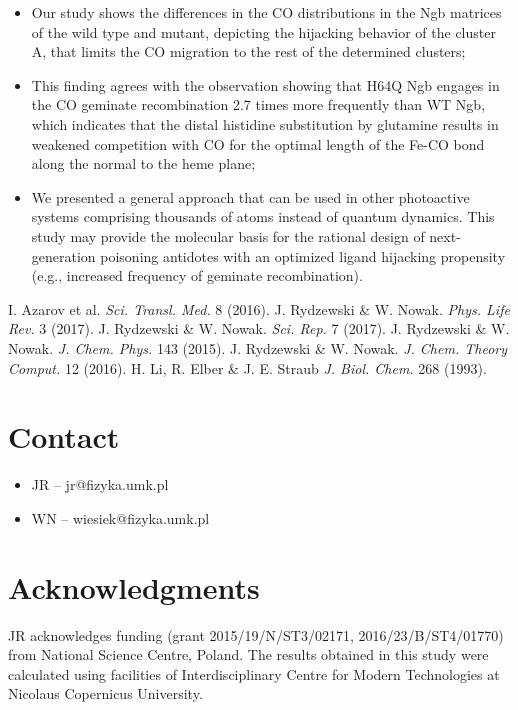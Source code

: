 \documentclass[a0,portrait]{a0poster}
\newcommand{\bi}{\item[\color{myblue}\ding{108}]}
\begin{document}
\begin{multicols}{2}
\begin{itemize}
\setlength\itemsep{1cm}
	\bi Our study shows the differences in the CO distributions in the Ngb matrices of the wild type and mutant, depicting the hijacking behavior of the cluster A, that limits the CO migration to the rest of the determined clusters;
	\bi This finding agrees with the observation showing that H64Q Ngb engages in the CO geminate recombination 2.7 times more frequently than WT Ngb, which indicates that the distal histidine substitution by glutamine results in weakened competition with CO for the optimal length of the Fe-CO bond along the normal to the heme plane;
	\bi We presented a general approach that can be used in other photoactive systems comprising thousands of atoms instead of quantum dynamics. This study may provide the molecular basis for the rational design of next-generation poisoning antidotes with an optimized ligand hijacking propensity (e.g., increased frequency of geminate recombination).
\end{itemize}

\color{myblue}
\begin{thebibliography}{6}%
\color{black}
 I. Azarov et al. \textit{Sci. Transl. Med.} 8 (2016).
 J. Rydzewski \& W. Nowak. \textit{Phys. Life Rev.} 3 (2017).
 J. Rydzewski \& W. Nowak. \textit{Sci. Rep.} 7 (2017).
 J. Rydzewski \& W. Nowak. \textit{J. Chem. Phys.} 143 (2015).
 J. Rydzewski \& W. Nowak. \textit{J. Chem. Theory Comput.} 12 (2016).
 H. Li, R. Elber \& J. E. Straub \textit{J. Biol. Chem.} 268 (1993).
\end{thebibliography}
\color{black}

\section*{\color{myblue} Contact}
\begin{itemize}
		\bi JR -- jr@fizyka.umk.pl
		\bi WN -- wiesiek@fizyka.umk.pl
\end{itemize}

\section*{\color{myblue} Acknowledgments}
JR acknowledges funding (grant 2015/19/N/ST3/02171, 2016/23/B/ST4/01770) from National Science Centre, Poland. The results obtained in this study were calculated using facilities of Interdisciplinary Centre for Modern Technologies at Nicolaus Copernicus University.

\end{multicols}
\end{document}
